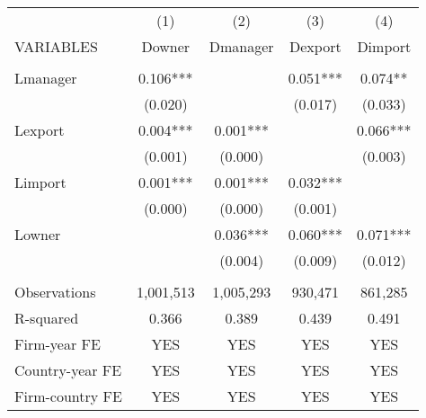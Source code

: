 \begin{tabular}{lcccc} \hline
 & (1) & (2) & (3) & (4) \\
VARIABLES & Downer & Dmanager & Dexport & Dimport \\ \hline
 &  &  &  &  \\
Lmanager & 0.106*** &  & 0.051*** & 0.074** \\
 & (0.020) &  & (0.017) & (0.033) \\
Lexport & 0.004*** & 0.001*** &  & 0.066*** \\
 & (0.001) & (0.000) &  & (0.003) \\
Limport & 0.001*** & 0.001*** & 0.032*** &  \\
 & (0.000) & (0.000) & (0.001) &  \\
Lowner &  & 0.036*** & 0.060*** & 0.071*** \\
 &  & (0.004) & (0.009) & (0.012) \\
 &  &  &  &  \\
Observations & 1,001,513 & 1,005,293 & 930,471 & 861,285 \\
R-squared & 0.366 & 0.389 & 0.439 & 0.491 \\
Firm-year FE & YES & YES & YES & YES \\
Country-year FE & YES & YES & YES & YES \\
 Firm-country FE & YES & YES & YES & YES \\ \hline
\end{tabular}
